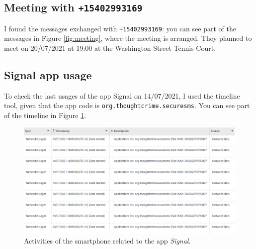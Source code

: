 \documentclass[12pt]{article}
\begin{document}
\subsection{Meeting with \texttt{+15402993169}}

I found the messages exchanged with \texttt{+15402993169}: you can see part of the messages in Figure \ref{fig:meeting}, where the meeting is arranged. They planned to meet on 20/07/2021 at 19:00 at the Washington Street Tennis Court.

\subsection{Signal app usage}

To check the last usages of the app Signal \cite{signal} on 14/07/2021, I used the timeline tool, given that the app code is \texttt{org.thoughtcrime.securesms}.
You can see part of the timeline in Figure \ref{fig:signal}.

\begin{figure}[!ht]
    \centering
    \includegraphics[width=\textwidth]{images/signal.png}
    \caption{Activities of the smartphone related to the app \textit{Signal}.}
    \label{fig:signal}
\end{figure}

\printbibliography[title={References}]
\end{document}
